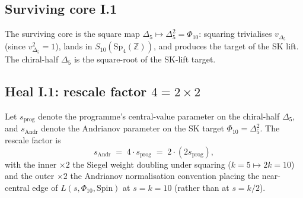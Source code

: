 \subsection*{Surviving core I.1}

The surviving core is the square map $\Delta_5 \mapsto \Delta_5^2 =
\Phi_{10}$: squaring trivialises $v_{\Delta_5}$ (since $v_{\Delta_5}^2
= 1$), lands in $S_{10}(\mathrm{Sp}_4(\mathbb{Z}))$, and produces the
target of the SK lift.  The chiral-half $\Delta_5$ is the
square-root of the SK-lift target.

\subsection*{Heal I.1: rescale factor $4 = 2 \times 2$}
\label{subsec:heal-I-1-rescale-4}

\begin{proposition}[Rescale $s_{\mathrm{prog}} = 5/2 \mapsto s_{\mathrm{Andr}}
= 10$ via factor $4$]
\label{prop:rescale-factor-4}
Let $s_{\mathrm{prog}}$ denote the programme's central-value parameter
on the chiral-half $\Delta_5$, and $s_{\mathrm{Andr}}$ denote the
Andrianov parameter on the SK target $\Phi_{10} = \Delta_5^2$.
The rescale factor is
\[
 s_{\mathrm{Andr}} \;=\; 4 \cdot s_{\mathrm{prog}} \;=\; 2 \cdot
 (2 s_{\mathrm{prog}}),
\]
with the inner $\times 2$ the Siegel weight doubling under squaring
($k = 5 \mapsto 2k = 10$) and the outer $\times 2$ the Andrianov
normalisation convention placing the near-central edge of
$L(s, \Phi_{10}, \mathrm{Spin})$ at $s = k = 10$ (rather than at
$s = k/2$).
\end{proposition}

